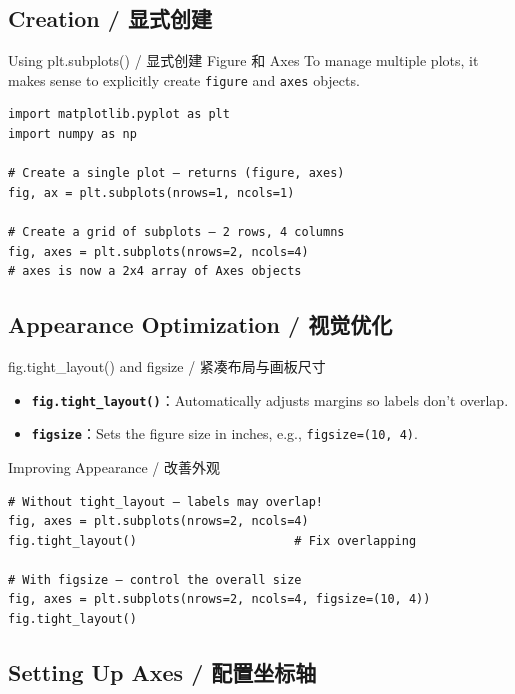 \documentclass[11pt,a4paper]{report}
\let\oldtexttt\texttt
\renewcommand{\texttt}[1]{\textcolor{mainblue}{\oldtexttt{#1}}}
\begin{document}
\subsection{Creation / 显式创建}

\begin{examplebox}{Using plt.subplots() / 显式创建 Figure 和 Axes}
    To manage multiple plots, it makes sense to explicitly create \texttt{figure} and \texttt{axes} objects.
\begin{lstlisting}
import matplotlib.pyplot as plt
import numpy as np

# Create a single plot — returns (figure, axes)
fig, ax = plt.subplots(nrows=1, ncols=1)

# Create a grid of subplots — 2 rows, 4 columns
fig, axes = plt.subplots(nrows=2, ncols=4)
# axes is now a 2x4 array of Axes objects
\end{lstlisting}
\end{examplebox}

\subsection{Appearance Optimization / 视觉优化}

\begin{concept}{fig.tight\_layout() and figsize / 紧凑布局与画板尺寸}
    \begin{itemize}[itemsep=0.5em]
        \item \textbf{\texttt{fig.tight\_layout()}}：Automatically adjusts margins so labels don't overlap.
        \item \textbf{\texttt{figsize}}：Sets the figure size in inches, e.g., \texttt{figsize=(10, 4)}.
    \end{itemize}
\end{concept}

\begin{examplebox}{Improving Appearance / 改善外观}
\begin{lstlisting}
# Without tight_layout — labels may overlap!
fig, axes = plt.subplots(nrows=2, ncols=4)
fig.tight_layout()                      # Fix overlapping

# With figsize — control the overall size
fig, axes = plt.subplots(nrows=2, ncols=4, figsize=(10, 4))
fig.tight_layout()
\end{lstlisting}
\end{examplebox}

\subsection{Setting Up Axes / 配置坐标轴}
\end{document}
